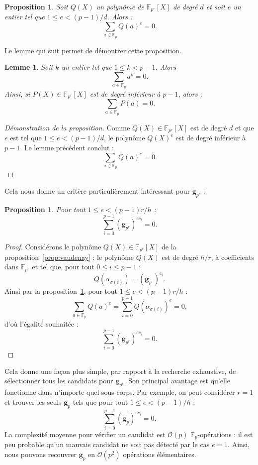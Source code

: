 \documentclass[a4paper, titlepage, 11pt]{article}
\newtheorem{lemm}[theo]{Lemme}
\newtheorem{prop}[theo]{Proposition}
\theoremstyle{definition}
\theoremstyle{remark}
\def\O{\mathcal O}
\def\gf #1{\mathbb{F}_{#1}}
\def\mbf #1{\mathbf{#1}}
\begin{document}
\begin{prop}\label{prop:faitCool}
Soit $Q(X)$ un polynôme de $\gf{p^r}[X]$ de degré $d$ et soit $e$ un entier tel que $1 \leqslant e < (p-1)/d$. Alors : $$\sum_{a \in \gf{p}} Q(a)^e = 0.$$
\end{prop}
Le lemme qui suit permet de démontrer cette proposition.

\begin{lemm}
Soit $k$ un entier tel que $1 \leqslant k < p-1$. Alors
$$\sum_{a\in\gf{p}} a^k = 0.$$
Ainsi, si $P(X) \in \gf{p^r}[X]$ est de degré inférieur à $p-1$, alors : $$\sum_{a\in\gf{p}} P(a) = 0.$$
\end{lemm}

\begin{proof}[Démonstration de la proposition]
Comme $Q(X) \in \gf{p^r}[X]$ est de degré $d$ et que $e$ est tel que $1\leqslant e < (p-1)/d$, le polynôme $Q(X)^e$ est de degré inférieur à $p-1$. Le lemme précédent conclut :
$$\sum_{a\in\gf{p}} Q(a)^e = 0.$$
\end{proof}

Cela nous donne un critère particulièrement intéressant pour $\mbf g_{p^r}$ :
\begin{prop}
Pour tout $1 \leqslant e < (p-1)r/h$ :
$$\sum_{i=0}^{p-1} (\mbf g_{p^r})^{ec_i} = 0.$$
\end{prop}
\begin{proof}
Considérons le polynôme $Q(X)\in\gf{p^r}[X]$ de la proposition~\ref{prop:vaudenay} : le polynôme $Q(X)$ est de degré $h/r$, à coefficients dans $\gf{p^r}$ et tel que, pour tout $0 \leqslant i \leqslant p-1$ :
$$Q\left(\alpha_{\sigma(i)}\right) = (\mbf g_{p^r})^{c_i}.$$
Ainsi par la proposition~\ref{prop:faitCool}, pour tout $1 \leqslant e < (p-1)r/h$ :
$$\sum_{a\in\gf{p}} Q(a)^e = \sum_{i=0}^{p-1} Q\left(\alpha_{\sigma(i)}\right)^e = 0,$$
d'où l'égalité souhaitée :
$$\sum_{i=0}^{p-1} (\mbf g_{p^r})^{ec_i} = 0.$$
\end{proof}
\noindent Cela donne une façon plus simple, par rapport à la recherche exhaustive, de sélectionner tous les candidats pour $\mbf g_{p^r}$. Son principal avantage est qu'elle fonctionne dans n'importe quel sous-corps. Par exemple, on peut considérer $r=1$ et trouver les seuls $\mbf g_p$ tels que pour tout $1 \leqslant e < (p-1)/h$ :
$$\sum_{i=0}^{p-1} (\mbf g_p)^{ec_i} = 0.$$
La complexité moyenne pour vérifier un candidat est $\O(p)$ $\gf{p}$-opérations : il est peu probable qu'un mauvais candidat ne soit pas détecté par le cas $e = 1$. Ainsi, nous pouvons recouvrer $\mbf g_p$ en $\O(p^2)$ opérations élémentaires.
\end{document}
